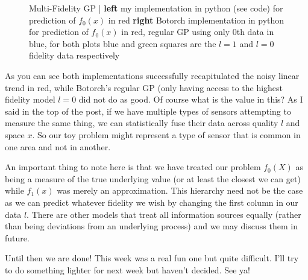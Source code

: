 \documentclass[12pt]{article}
\begin{document}
\begin{figure}[h]
\centering
{}
\caption{Multi-Fidelity GP | \textbf{left} my implementation in python (see code) for prediction of $f_0(x)$ in red \textbf{right} Botorch implementation in python for prediction of $f_0(x)$ in red, regular GP using only 0th data in blue, for both plots blue and green squares are the $l=1$ and $l=0$ fidelity data respectively}
\end{figure}

\vspace{5mm}

As you can see both implementations successfully recapitulated the noisy linear trend in red, while Botorch's regular GP (only having access to the highest fidelity model $l=0$ did not do as good. Of course what is the value in this? As I said in the top of the post, if we have multiple types of sensors attempting to measure the same thing, we can statistically fuse their data across quality $l$ and space $x$. So our toy problem might represent a type of sensor that is common in one area and not in another. 

\vspace{5mm}

An important thing to note here is that we have treated our problem $f_0(X)$ as being a measure of the true underlying value (or at least the closest we can get) while $f_1(x)$ was merely an approximation. This hierarchy need not be the case as we can predict whatever fidelity we wish by changing the first column in our data $l$. There are other models that treat all information sources equally (rather than being deviations from an underlying process) and we may discuss them in future. 

\vspace{5mm}

Until then we are done! This week was a real fun one but quite difficult. I'll try to do something lighter for next week but haven't decided. See ya!
\end{document}
